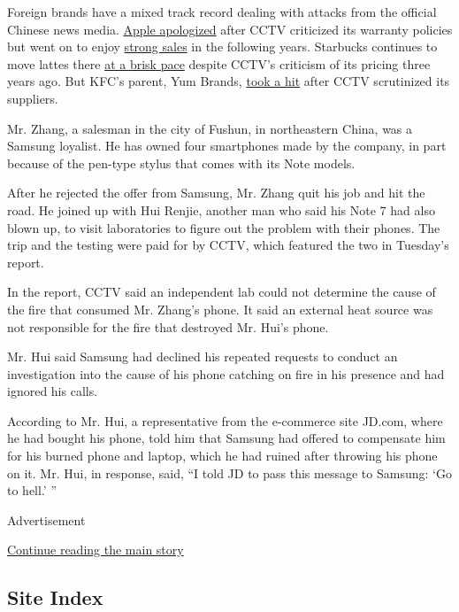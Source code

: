 Foreign brands have a mixed track record dealing with attacks from the
official Chinese news media.
\href{http://www.nytimes.com/2013/04/02/technology/apples-chief-tim-cook-apologizes-to-china-over-warranty-policy.html}{Apple
apologized} after CCTV criticized its warranty policies but went on to
enjoy
\href{http://www.nytimes.com/2015/08/25/technology/tim-cook-of-apple-seeks-to-quell-china-fears-in-email-to-jim-cramer.html}{strong
sales} in the following years. Starbucks continues to move lattes there
\href{http://sinosphere.blogs.nytimes.com/2013/10/21/state-media-call-starbucks-too-pricey/}{at
a brisk pace} despite CCTV's criticism of its pricing three years ago.
But KFC's parent, Yum Brands,
\href{http://www.nytimes.com/2013/02/06/business/global/kfc-parent-suffers-after-china-scandal.html}{took
a hit} after CCTV scrutinized its suppliers.

Mr. Zhang, a salesman in the city of Fushun, in northeastern China, was
a Samsung loyalist. He has owned four smartphones made by the company,
in part because of the pen-type stylus that comes with its Note models.

After he rejected the offer from Samsung, Mr. Zhang quit his job and hit
the road. He joined up with Hui Renjie, another man who said his Note 7
had also blown up, to visit laboratories to figure out the problem with
their phones. The trip and the testing were paid for by CCTV, which
featured the two in Tuesday's report.

In the report, CCTV said an independent lab could not determine the
cause of the fire that consumed Mr. Zhang's phone. It said an external
heat source was not responsible for the fire that destroyed Mr. Hui's
phone.

Mr. Hui said Samsung had declined his repeated requests to conduct an
investigation into the cause of his phone catching on fire in his
presence and had ignored his calls.

According to Mr. Hui, a representative from the e-commerce site JD.com,
where he had bought his phone, told him that Samsung had offered to
compensate him for his burned phone and laptop, which he had ruined
after throwing his phone on it. Mr. Hui, in response, said, ``I told JD
to pass this message to Samsung: `Go to hell.' ''

Advertisement

\protect\hyperlink{after-bottom}{Continue reading the main story}

\hypertarget{site-index}{%
\subsection{Site Index}\label{site-index}}

